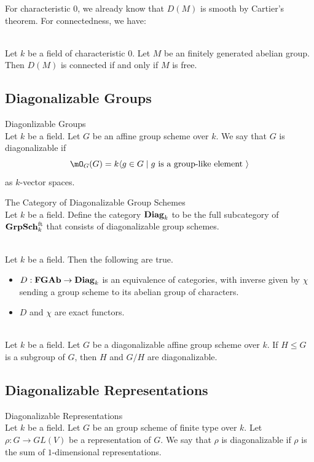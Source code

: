 \documentclass[a4paper]{article}
\begin{document}
For characteristic $0$, we already know that $D(M)$ is smooth by Cartier's theorem. For connectedness, we have: 

\begin{prp}{}{}\\
Let $k$ be a field of characteristic $0$. Let $M$ be an finitely generated abelian group. Then $D(M)$ is connected if and only if $M$ is free. 
\end{prp}

\subsection{Diagonalizable Groups}
\begin{defn}{Diagonlizable Groups}{}\\
Let $k$ be a field. Let $G$ be an affine group scheme over $k$. We say that $G$ is diagonalizable if $$\mO_G(G)=k\langle g\in G\;|\;g\text{ is a group-like element }\rangle$$ as $k$-vector spaces. 
\end{defn}

\begin{defn}{The Category of Diagonalizable Group Schemes}{}\\
Let $k$ be a field. Define the category $\bold{Diag}_k$ to be the full subcategory of $\bold{GrpSch}_k^\text{ft}$ that consists of diagonalizable group schemes. 
\end{defn}

\begin{prp}{}{}\\
Let $k$ be a field. Then the following are true. 
\begin{itemize}
\item $D:\bold{FGAb}\to\bold{Diag}_k$ is an equivalence of categories, with inverse given by $\chi$ sending a group scheme to its abelian group of characters. 
\item $D$ and $\chi$ are exact functors. 
\end{itemize}
\end{prp}

\begin{crl}{}{}\\
Let $k$ be a field. Let $G$ be a diagonalizable affine group scheme over $k$. If $H\leq G$ is a subgroup of $G$, then $H$ and $G/H$ are diagonalizable. 
\end{crl}

\subsection{Diagonalizable Representations}
\begin{defn}{Diagonalizable Representations}{}\\
Let $k$ be a field. Let $G$ be an group scheme of finite type over $k$. Let $\rho:G\to GL(V)$ be a representation of $G$. We say that $\rho$ is diagonalizable if $\rho$ is the sum of $1$-dimensional representations. 
\end{defn}
\end{document}
